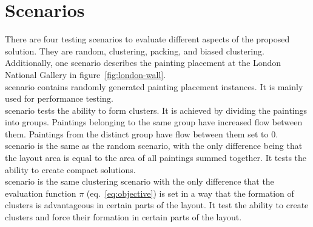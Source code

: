\section{Scenarios}\label{sec:scenarios}

There are four testing scenarios to evaluate different aspects of the proposed solution.
They are random, clustering, packing, and biased clustering.
Additionally, one scenario describes the painting placement at the London National Gallery in figure~\ref{fig:london-wall}. \\

 scenario contains randomly generated painting placement instances. It is mainly used for performance testing.
\\

 scenario tests the ability to form clusters.
It is achieved by dividing the paintings into groups.
Paintings belonging to the same group have increased flow between them.
Paintings from the distinct group have flow between them set to 0.
\\

 scenario is the same as the random scenario, with the only difference being that the layout area is equal to the area of all paintings summed together.
It tests the ability to create compact solutions.
\\

 scenario is the same clustering scenario with the only difference
that the evaluation function $\pi$ (eq.~\ref{eq:objective})
is set in a way that the formation of clusters is advantageous in certain parts of the layout.
It test the ability to create clusters and force their formation in certain parts of the layout.\\

